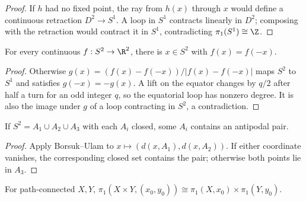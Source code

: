 \begin{proof}
\sketch If $h$ had no fixed point, the ray from $h(x)$ through $x$ would
define a continuous retraction $D^2\to S^1$. A loop in $S^1$ contracts
linearly in $D^2$; composing with the retraction would contract it in $S^1$,
contradicting $\pi_1(S^1)\cong\Z$.
\end{proof}

\begin{theorem}
\label{thm:borsuk-ulam-dim2}



For every continuous $f:S^2\to\R^2$, there is $x\in S^2$ with $f(x)=f(-x)$.
\end{theorem}

\begin{proof}
\sketch Otherwise $g(x)=(f(x)-f(-x))/|f(x)-f(-x)|$ maps $S^2$ to $S^1$
and satisfies $g(-x)=-g(x)$. A lift on the equator changes by $q/2$ after
half a turn for an odd integer $q$, so the equatorial loop has nonzero degree.
It is also the image under $g$ of a loop contracting in $S^2$, a contradiction.
\end{proof}

\begin{corollary}
\label{cor:sphere-three-closed-sets-antipodal}



If $S^2=A_1\cup A_2\cup A_3$ with each $A_i$ closed, some $A_i$ contains
an antipodal pair.
\end{corollary}

\begin{proof}
\sketch Apply Borsuk--Ulam to
$x\mapsto(d(x,A_1),d(x,A_2))$. If either coordinate vanishes, the corresponding
closed set contains the pair; otherwise both points lie in $A_3$.
\end{proof}

\begin{proposition}[$\pi_1$ of a product]
\label{prop:pi1-of-product-space}



For path-connected $X,Y$,
$\pi_1(X\times Y,(x_0,y_0))\cong\pi_1(X,x_0)\times\pi_1(Y,y_0)$.
\end{proposition}

